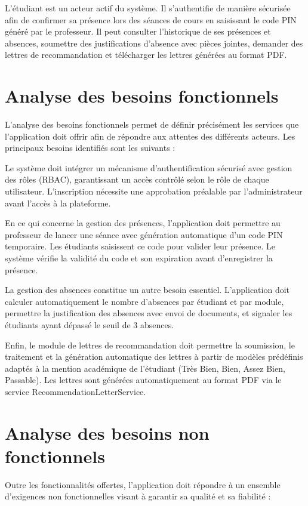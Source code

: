 \documentclass[12pt, a4paper, openright]{report}
\begin{document}
L'étudiant est un acteur actif du système. Il s'authentifie de manière sécurisée afin de confirmer sa présence lors des séances de cours en saisissant le code PIN généré par le professeur. Il peut consulter l'historique de ses présences et absences, soumettre des justifications d'absence avec pièces jointes, demander des lettres de recommandation et télécharger les lettres générées au format PDF.

\section{Analyse des besoins fonctionnels}

L'analyse des besoins fonctionnels permet de définir précisément les services que l'application doit offrir afin de répondre aux attentes des différents acteurs. Les principaux besoins identifiés sont les suivants :

Le système doit intégrer un mécanisme d'authentification sécurisé avec gestion des rôles (RBAC), garantissant un accès contrôlé selon le rôle de chaque utilisateur. L'inscription nécessite une approbation préalable par l'administrateur avant l'accès à la plateforme.

En ce qui concerne la gestion des présences, l'application doit permettre au professeur de lancer une séance avec génération automatique d'un code PIN temporaire. Les étudiants saisissent ce code pour valider leur présence. Le système vérifie la validité du code et son expiration avant d'enregistrer la présence.

La gestion des absences constitue un autre besoin essentiel. L'application doit calculer automatiquement le nombre d'absences par étudiant et par module, permettre la justification des absences avec envoi de documents, et signaler les étudiants ayant dépassé le seuil de 3 absences.

Enfin, le module de lettres de recommandation doit permettre la soumission, le traitement et la génération automatique des lettres à partir de modèles prédéfinis adaptés à la mention académique de l'étudiant (Très Bien, Bien, Assez Bien, Passable). Les lettres sont générées automatiquement au format PDF via le service RecommendationLetterService.

\section{Analyse des besoins non fonctionnels}

Outre les fonctionnalités offertes, l'application doit répondre à un ensemble d'exigences non fonctionnelles visant à garantir sa qualité et sa fiabilité :
\end{document}
